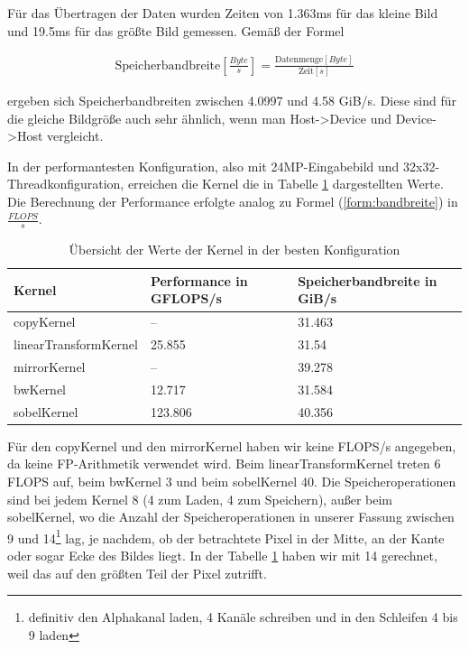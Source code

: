 \documentclass[12pt,a4paper]{scrartcl}
\begin{document}
F\"ur das \"Ubertragen der Daten wurden Zeiten von 1.363ms f\"ur das kleine Bild und 19.5ms f\"ur das gr\"o\ss{}te Bild gemessen.
Gem\"a\ss{} der Formel

\begin{align}\label{form:bandbreite}
    \text{Speicherbandbreite}[\frac{Byte}{s}] = \frac{\text{Datenmenge}[Byte]}{\text{Zeit}[s]}
\end{align}

ergeben sich Speicherbandbreiten zwischen 4.0997 und 4.58 GiB/s.
Diese sind f\"ur die gleiche Bildgr\"o\ss{}e auch sehr \"ahnlich, wenn man Host->Device und Device->Host vergleicht.

In der performantesten Konfiguration, also mit 24MP-Eingabebild und 32x32-Threadkonfiguration, erreichen die Kernel die in Tabelle \ref{tab:perf} dargestellten Werte.
Die Berechnung der Performance erfolgte analog zu Formel (\ref{form:bandbreite}) in $\frac{FLOPS}{s}$.

\begin{table}[h]
    \centering
    \begin{tabular}{l|l|l}
    \hline
    Kernel & Performance in GFLOPS/s & Speicherbandbreite in GiB/s \\
    \hline
    copyKernel & --                  & 31.463 \\
    linearTransformKernel & 25.855   & 31.54 \\
    mirrorKernel & --                & 39.278 \\
    bwKernel & 12.717                & 31.584 \\
    sobelKernel & 123.806            & 40.356 \\
    \hline
    \end{tabular}
    \caption{\"Ubersicht der Werte der Kernel in der besten Konfiguration}
    \label{tab:perf}
\end{table}

F\"ur den copyKernel und den mirrorKernel haben wir keine FLOPS/s angegeben, da keine FP-Arithmetik verwendet wird.
Beim linearTransformKernel treten 6 FLOPS auf, beim bwKernel 3 und beim sobelKernel 40.
Die Speicheroperationen sind bei jedem Kernel 8 (4 zum Laden, 4 zum Speichern), au\ss{}er beim sobelKernel, wo die Anzahl der Speicheroperationen in unserer Fassung zwischen 9 und 14\footnote{definitiv den Alphakanal laden, 4 Kan\"ale schreiben und in den Schleifen 4 bis 9 laden} lag, je nachdem, ob der betrachtete Pixel in der Mitte, an der Kante oder sogar Ecke des Bildes liegt.
In der Tabelle \ref{tab:perf} haben wir mit 14 gerechnet, weil das auf den gr\"o\ss{}ten Teil der Pixel zutrifft.
\end{document}
